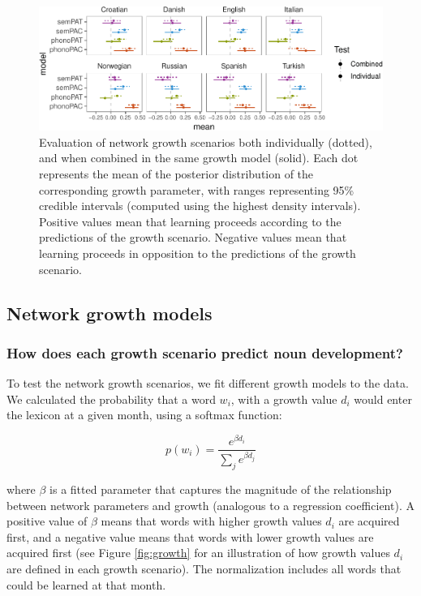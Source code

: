 \documentclass[10pt, letterpaper]{article}
\newenvironment{CodeChunk}{}{}
\begin{document}
\begin{CodeChunk}
\begin{figure}[h]

{\centering \includegraphics{figs/pred_ind_img-1} 

}

\caption{\label{fig:pred_ind}Evaluation of network growth scenarios both individually (dotted), and when combined in the same growth model (solid). Each dot represents the mean of the posterior distribution of the corresponding growth parameter, with ranges representing 95\% credible intervals (computed using the highest density intervals). Positive values mean that learning proceeds according to the predictions of the growth scenario. Negative values mean that learning proceeds in opposition to the predictions of the growth scenario.}\label{fig:pred_ind_img}
\end{figure}
\end{CodeChunk}

\subsection{Network growth models}\label{network-growth-models}

\subsubsection{How does each growth scenario predict noun
development?}\label{how-does-each-growth-scenario-predict-noun-development}

To test the network growth scenarios, we fit different growth models to
the data. We calculated the probability that a word \(w_i\), with a
growth value \(d_i\) would enter the lexicon at a given month, using a
softmax function:

\begin{equation}
 p(w_i)= \frac{e^{\beta d_i}}{\sum_j e^{\beta d_j} }
\end{equation}

\noindent where \(\beta\) is a fitted parameter that captures the
magnitude of the relationship between network parameters and growth
(analogous to a regression coefficient). A positive value of \(\beta\)
means that words with higher growth values \(d_i\) are acquired first,
and a negative value means that words with lower growth values are
acquired first (see Figure \ref{fig:growth} for an illustration of how
growth values \(d_i\) are defined in each growth scenario). The
normalization includes all words that could be learned at that month.
\end{document}
